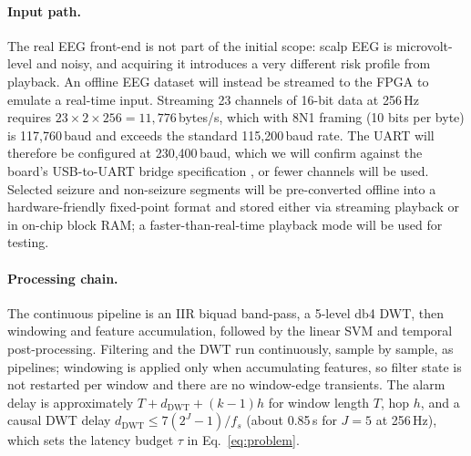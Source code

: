 \documentclass[10pt,twocolumn,letterpaper]{article}
\begin{document}
\paragraph{Input path.} The real EEG front-end is not part of the initial
scope: scalp EEG is microvolt-level and noisy, and acquiring it
introduces a very different risk profile from playback. An offline EEG
dataset will instead be streamed to the FPGA to emulate a real-time
input. Streaming 23 channels of 16-bit data at 256\,Hz requires
$23\times2\times256=11{,}776$\,bytes/s, which with 8N1 framing (10 bits
per byte) is 117,760\,baud and exceeds the standard 115,200\,baud rate.
The UART will therefore be configured at 230,400\,baud, which we will
confirm against the board's USB-to-UART bridge specification
\cite{realdigital2024boolean}, or fewer channels will be used. Selected
seizure and non-seizure segments will be pre-converted offline into a
hardware-friendly fixed-point format and stored either via streaming
playback or in on-chip block RAM; a faster-than-real-time playback mode
will be used for testing.

\paragraph{Processing chain.} The continuous pipeline is an IIR biquad
band-pass, a 5-level db4 DWT, then windowing and feature accumulation,
followed by the linear SVM and temporal post-processing. Filtering and
the DWT run continuously, sample by sample, as pipelines; windowing is
applied only when accumulating features, so filter state is not
restarted per window and there are no window-edge transients. The
alarm delay is approximately $T + d_{\mathrm{DWT}} + (k-1)h$ for window
length $T$, hop $h$, and a causal DWT delay $d_{\mathrm{DWT}}\le
7(2^{J}-1)/f_s$ (about 0.85\,s for $J=5$ at 256\,Hz), which sets the
latency budget $\tau$ in Eq.~\eqref{eq:problem}.
\end{document}
